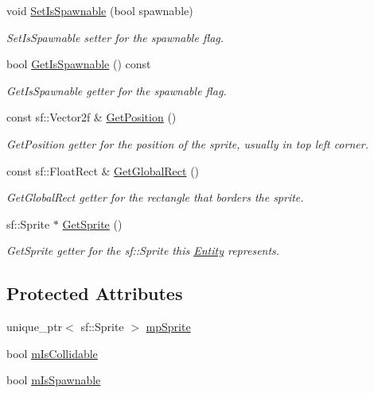\begin{DoxyCompactItemize}
void \hyperlink{class_entity_abfdb5c682a32f0b5addfc77f171e4004}{Set\-Is\-Spawnable} (bool spawnable)
\begin{DoxyCompactList}\small\item\em Set\-Is\-Spawnable setter for the spawnable flag. \end{DoxyCompactList}\item 
bool \hyperlink{class_entity_aba3aa520f80f99a083fbfb2b604783cd}{Get\-Is\-Spawnable} () const 
\begin{DoxyCompactList}\small\item\em Get\-Is\-Spawnable getter for the spawnable flag. \end{DoxyCompactList}\item 
const sf\-::\-Vector2f \& \hyperlink{class_entity_a384e8c07dd367654bfba85c9921e0f88}{Get\-Position} ()
\begin{DoxyCompactList}\small\item\em Get\-Position getter for the position of the sprite, usually in top left corner. \end{DoxyCompactList}\item 
const sf\-::\-Float\-Rect \& \hyperlink{class_entity_a5e2cbcbaac883ed921888e6a90070d96}{Get\-Global\-Rect} ()
\begin{DoxyCompactList}\small\item\em Get\-Global\-Rect getter for the rectangle that borders the sprite. \end{DoxyCompactList}\item 
sf\-::\-Sprite $\ast$ \hyperlink{class_entity_a4481e6a0bf40afab75321078be213ebb}{Get\-Sprite} ()
\begin{DoxyCompactList}\small\item\em Get\-Sprite getter for the sf\-::\-Sprite this \hyperlink{class_entity}{Entity} represents. \end{DoxyCompactList}\end{DoxyCompactItemize}
\subsection*{Protected Attributes}
\begin{DoxyCompactItemize}
\item 
unique\-\_\-ptr$<$ sf\-::\-Sprite $>$ \hyperlink{class_entity_a52b9048640f6ffadfbc3e93d6184fe1f}{mp\-Sprite}
\item 
bool \hyperlink{class_entity_ade1f7c65bf9761c8e20188e67cb45556}{m\-Is\-Collidable}
\item 
bool \hyperlink{class_entity_a13cc8677fa51642cc3d60c13e9566dab}{m\-Is\-Spawnable}
\end{DoxyCompactItemize}


